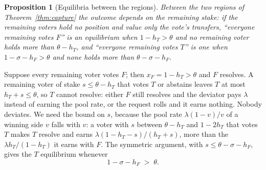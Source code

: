 \documentclass[conference,compsoc]{IEEEtran}
\newtheorem{proposition}{Proposition}
\newcommand{\hF}{h_{F}}
\newcommand{\hT}{h_{T}}
\begin{document}
\begin{proposition}[Equilibria between the regions]
\label{prop:equilibria}
Between the two regions of Theorem~\ref{thm:capture} the outcome depends on the remaining stake: if the remaining voters hold no position and value only the vote's transfers, ``everyone remaining votes $F$'' is an equilibrium when $1 - \hT > \theta$ and no remaining voter holds more than $\theta - \hT$, and ``everyone remaining votes $T$'' is one when $1 - \sigma - \hF > \theta$ and none holds more than $\theta - \sigma - \hF$.
\end{proposition}
\begin{IEEEproof}
 Suppose every remaining voter votes $F$; then $x_F = 1 - \hT > \theta$ and $F$ resolves. A remaining voter of stake $s \le \theta - \hT$ that votes $T$ or abstains leaves $T$ at most $\hT + s \le \theta$, so $T$ cannot resolve: either $F$ still resolves and the deviator pays $\lambda$ instead of earning the pool rate, or the request rolls and it earns nothing. Nobody deviates. We need the bound on $s$, because the pool rate $\lambda(1 - v)/v$ of a winning side $v$ falls with $v$: a voter with $s$ between $\theta - \hT$ and $1 - 2\hT$ that votes $T$ makes $T$ resolve and earns $\lambda(1 - \hT - s)/(\hT + s)$, more than the $\lambda\hT/(1 - \hT)$ it earns with $F$. The symmetric argument, with $s \le \theta - \sigma - \hF$, gives the $T$ equilibrium whenever
\[
1 - \sigma - \hF \;>\; \theta .
\]
\end{IEEEproof}
\end{document}
